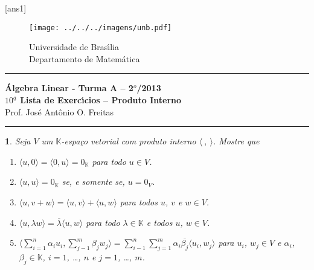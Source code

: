 \documentclass[12pt]{exam}
\newtheorem{exercicio}{}
\newcommand{\cp}[1]{\mathbb{#1}}
\newcommand{\vesp}[1]{\vspace{ #1  cm}}
\begin{document}
\pagestyle{empty}

[ans1]

\begin{figure}[h]
        \begin{minipage}[c]{1.7cm}
        \texttt{[image: ../../../imagens/unb.pdf]}
        \end{minipage}%
        \hspace{0pt}
        \begin{minipage}[c]{4in}
          {Universidade de Bras{\'\i}lia} \\
          {Departamento de Matem{\'a}tica}
\end{minipage}
\end{figure}

\vesp{-0.35} \hrule

\begin{center}
{\Large\bf \'Algebra Linear - Turma A -- 2$^{o}$/2013} \\ \vspace{9pt} {\large\bf
  $10^{\underline{a}}$ Lista de Exerc{\'\i}cios -- Produto Interno}\\ \vspace{9pt} Prof. Jos{\'e} Ant{\^o}nio O. Freitas
\end{center}
\hrule

\vesp{.6}

\begin{exercicio}
  Seja $V$ um $\cp{K}$-espa\c{c}o vetorial com produto interno $\langle\ ,\ \rangle$. Mostre que
  \begin{enumerate}[label=({\alph*})]
    \item $\langle u, 0\rangle = \langle 0, u\rangle = 0_\cp{K}$ para todo $u \in V$.
    \item $\langle u, u\rangle = 0_\cp{K}$ se, e somente se, $u = 0_V$.
    \item $\langle u, v + w\rangle = \langle u, v\rangle + \langle u, w\rangle$ para todos $u$, $v$ e $w \in V$.
    \item $\langle u, \lambda w\rangle = \overline{\lambda} \langle u, w\rangle$ para todo $\lambda \in \cp{K}$ e todos $u$, $w \in V$.
    \item $\displaystyle\langle \sum_{i = 1}^n\alpha_iu_i, \sum_{j - 1}^m\beta_jw_j\rangle = \sum_{i - 1}^n\sum_{j = 1}^m\alpha_i\overline{\beta_j}\langle u_i, w_j \rangle$ para $u_i$, $w_j \in V$ e $\alpha_i$, $\beta_j \in \cp{K}$, $i = 1$, \dots, $n$ e $j = 1$, \dots, $m$.
  \end{enumerate}
\end{exercicio}
\end{document}
